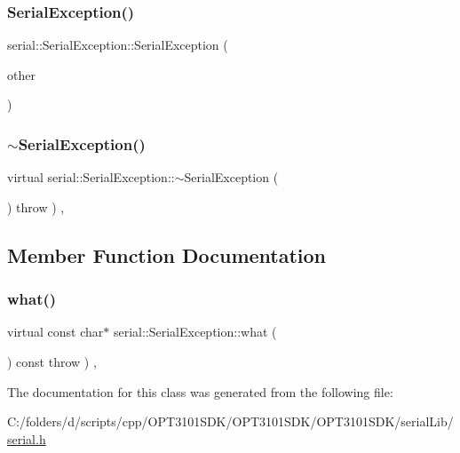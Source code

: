 \subsubsection{\texorpdfstring{Serial\+Exception()}{SerialException()}\hspace{0.1cm}{\footnotesize\ttfamily [2/2]}}
{\footnotesize\ttfamily serial\+::\+Serial\+Exception\+::\+Serial\+Exception (\begin{DoxyParamCaption}\item[{const \mbox{\hyperlink{classserial_1_1_serial_exception}{Serial\+Exception}} \&}]{other }\end{DoxyParamCaption})\hspace{0.3cm}{\ttfamily [inline]}}

\mbox{\label{classserial_1_1_serial_exception_a8504adb442f224ec2798e4bd33115fe3}} 
\subsubsection{\texorpdfstring{$\sim$\+Serial\+Exception()}{~SerialException()}}
{\footnotesize\ttfamily virtual serial\+::\+Serial\+Exception\+::$\sim$\+Serial\+Exception (\begin{DoxyParamCaption}{ }\end{DoxyParamCaption}) throw  ) \hspace{0.3cm}{\ttfamily [inline]}, {\ttfamily [virtual]}}



\subsection{Member Function Documentation}
\mbox{\label{classserial_1_1_serial_exception_a8243a4e5c5414834d3ac347c325b961f}} 
\subsubsection{\texorpdfstring{what()}{what()}}
{\footnotesize\ttfamily virtual const char$\ast$ serial\+::\+Serial\+Exception\+::what (\begin{DoxyParamCaption}{ }\end{DoxyParamCaption}) const throw  ) \hspace{0.3cm}{\ttfamily [inline]}, {\ttfamily [virtual]}}



The documentation for this class was generated from the following file\+:\begin{DoxyCompactItemize}
\item 
C\+:/folders/d/scripts/cpp/\+O\+P\+T3101\+S\+D\+K/\+O\+P\+T3101\+S\+D\+K/\+O\+P\+T3101\+S\+D\+K/serial\+Lib/\mbox{\hyperlink{serial_8h}{serial.\+h}}\end{DoxyCompactItemize}
